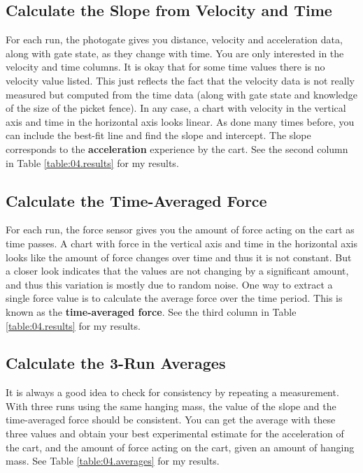 \subsection{Calculate the Slope from Velocity and Time}
%
For each run, the photogate gives you distance, velocity and acceleration data, along with gate state, as they change with time. You are only interested in the velocity and time columns. It is okay that for some time values there is no velocity value listed. This just reflects the fact that the velocity data is not really measured but computed from the time data (along with gate state and knowledge of the size of the picket fence). In any case, a chart with velocity in the vertical axis and time in the horizontal axis looks linear. As done many times before, you can include the best-fit line and find the slope and intercept. The slope corresponds to the \textbf{acceleration} experience by the cart. See the second column in Table \ref{table:04.results} for my results.
%
\subsection{Calculate the Time-Averaged Force}
%
For each run, the force sensor gives you the amount of force acting on the cart as time passes. A chart with force in the vertical axis and time in the horizontal axis looks like the amount of force changes over time and thus it is not constant. But a closer look indicates that the values are not changing by a significant amount, and thus this variation is mostly due to random noise. One way to extract a single force value is to calculate the average force over the time period. This is known as the \textbf{time-averaged force}. See the third column in Table \ref{table:04.results} for my results.
%
\subsection{Calculate the 3-Run Averages}
%
It is always a good idea to check for consistency by repeating a measurement. With three runs using the same hanging mass, the value of the slope and the time-averaged force should be consistent. You can get the average with these three values and obtain your best experimental estimate for the acceleration of the cart, and the amount of force acting on the cart, given an amount of hanging mass. See Table \ref{table:04.averages} for my results.
%
